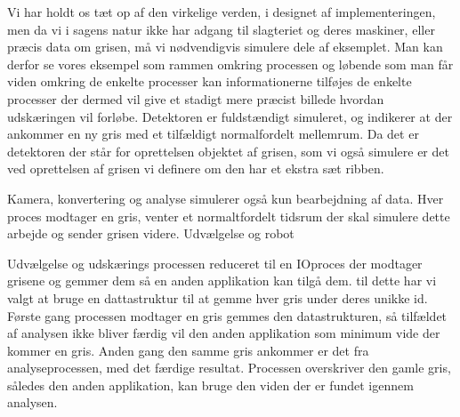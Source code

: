 Vi har holdt os tæt op af den virkelige verden, i designet af implementeringen, men da vi i sagens natur ikke har adgang til slagteriet og deres maskiner, eller præcis data om grisen, må vi nødvendigvis simulere dele af eksemplet. Man kan derfor se vores eksempel som rammen omkring processen og løbende som man får viden omkring de enkelte processer kan informationerne tilføjes de enkelte processer der dermed vil  give et stadigt mere præcist billede hvordan udskæringen vil forløbe. Detektoren er fuldstændigt simuleret, og indikerer at der ankommer en ny gris med et tilfældigt normalfordelt mellemrum. Da det er detektoren der står for oprettelsen objektet af grisen, som vi også simulere er det ved oprettelsen af grisen vi definere om den har et ekstra sæt ribben. 

Kamera, konvertering og analyse simulerer også kun bearbejdning af data. Hver proces modtager en gris, venter et normaltfordelt tidsrum der skal simulere dette arbejde og sender grisen videre. Udvælgelse og robot

Udvælgelse og udskærings processen reduceret til en IOproces der  modtager grisene og gemmer dem så en anden applikation kan tilgå dem.  til dette har vi valgt at bruge en  dattastruktur til at gemme  hver gris under deres unikke id. Første gang processen modtager en gris gemmes den datastrukturen, så  tilfældet af analysen ikke bliver færdig vil den anden applikation som minimum vide der kommer en gris. Anden gang den samme gris ankommer er det fra analyseprocessen, med det færdige resultat. Processen overskriver den gamle gris, således den anden applikation, kan bruge den viden der er fundet igennem analysen.


